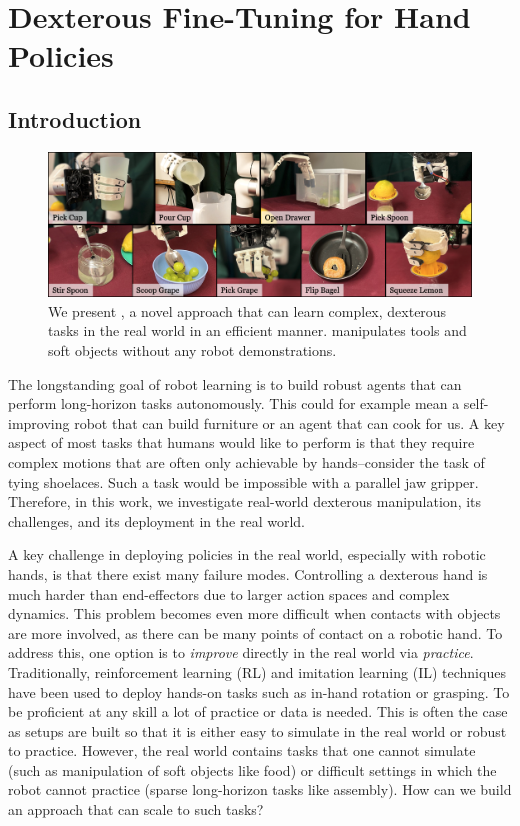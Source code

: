 \chapter{Dexterous Fine-Tuning for Hand Policies}
\label{cha:deft}

\section{Introduction}
\label{sec:intro}

\begin{figure}[H]
\centering
\includegraphics[width=\linewidth]{figs/teaser.pdf}
\vspace{-0.2in}
  \caption{\small We present \ours, a novel approach that can learn complex, dexterous tasks in the real world in an efficient manner. \ours manipulates tools and soft objects without any robot demonstrations.}
 \label{fig:teaser}
\end{figure}


The longstanding goal of robot learning is to build robust agents that can perform long-horizon tasks autonomously. This could for example mean a self-improving robot that can build furniture or an agent that can cook for us. A key aspect of most tasks that humans would like to perform is that they require complex motions that are often only achievable by hands--consider the task of tying shoelaces. Such a task would be impossible with a parallel jaw gripper. Therefore, in this work, we investigate real-world dexterous manipulation, its challenges, and its deployment in the real world. 

A key challenge in deploying  policies in the real world, especially with robotic hands, is that there exist many failure modes. Controlling a dexterous hand is much harder than end-effectors due to larger action spaces and complex dynamics. This problem becomes even more difficult when contacts with objects are more involved, as there can be many points of contact on a robotic hand. To address this, one option is to \textit{improve} directly in the real world via \textit{practice}. Traditionally, reinforcement learning (RL) and imitation learning (IL) techniques have been used to deploy hands-on tasks such as in-hand rotation or grasping. To be proficient at any skill a lot of practice or data is needed. This is often the case as setups are built so that it is either easy to simulate in the real world or robust to practice. However, the real world contains tasks that one cannot simulate (such as manipulation of soft objects like food) or difficult settings in which the robot cannot practice (sparse long-horizon tasks like assembly). How can we build an approach that can scale to such tasks? 

